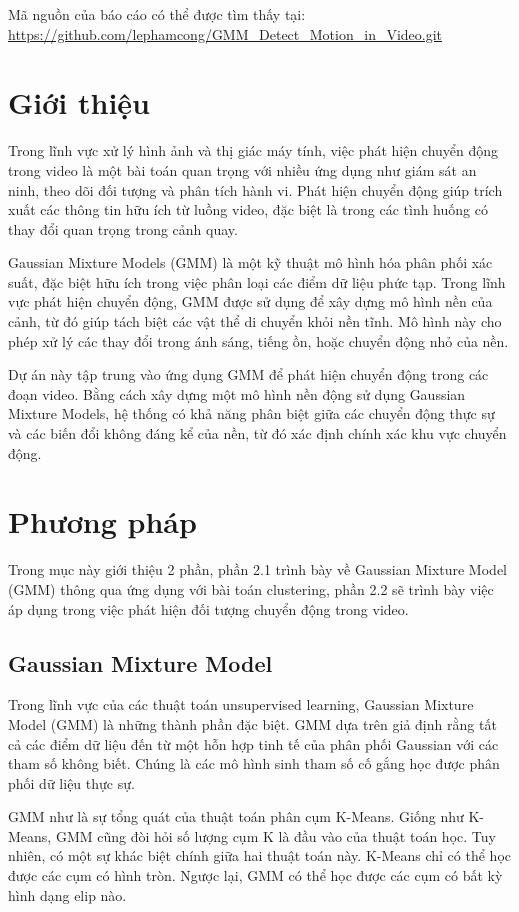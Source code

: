 \documentclass[a4paper]{article}
\begin{document}
Mã nguồn của báo cáo có thể được tìm thấy tại: \url{https://github.com/lephamcong/GMM_Detect_Motion_in_Video.git}

\section{Giới thiệu}
Trong lĩnh vực xử lý hình ảnh và thị giác máy tính, việc phát hiện chuyển động trong video là một bài toán quan trọng với nhiều ứng dụng như giám sát an ninh, theo dõi đối tượng và phân tích hành vi. Phát hiện chuyển động giúp trích xuất các thông tin hữu ích từ luồng video, đặc biệt là trong các tình huống có thay đổi quan trọng trong cảnh quay.

Gaussian Mixture Models (GMM) là một kỹ thuật mô hình hóa phân phối xác suất, đặc biệt hữu ích trong việc phân loại các điểm dữ liệu phức tạp. Trong lĩnh vực phát hiện chuyển động, GMM được sử dụng để xây dựng mô hình nền của cảnh, từ đó giúp tách biệt các vật thể di chuyển khỏi nền tĩnh. Mô hình này cho phép xử lý các thay đổi trong ánh sáng, tiếng ồn, hoặc chuyển động nhỏ của nền.

Dự án này tập trung vào ứng dụng GMM để phát hiện chuyển động trong các đoạn video. Bằng cách xây dựng một mô hình nền động sử dụng Gaussian Mixture Models, hệ thống có khả năng phân biệt giữa các chuyển động thực sự và các biến đổi không đáng kể của nền, từ đó xác định chính xác khu vực chuyển động.

\section{Phương pháp}
Trong mục này giới thiệu 2 phần, phần 2.1 trình bày về Gaussian Mixture Model (GMM) thông qua ứng dụng với bài toán clustering, phần 2.2 sẽ trình bày việc áp dụng trong việc phát hiện đối tượng chuyển động trong video.

\subsection{Gaussian Mixture Model\cite{gaussian_mixture_python}}
Trong lĩnh vực của các thuật toán unsupervised learning, Gaussian Mixture Model  (GMM) là những thành phần đặc biệt. GMM dựa trên giả định rằng tất cả các điểm dữ liệu đến từ một hỗn hợp tinh tế của phân phối Gaussian với các tham số không biết. Chúng là các mô hình sinh tham số cố gắng học được phân phối dữ liệu thực sự. 

GMM như là sự tổng quát của thuật toán phân cụm K-Means. Giống như K-Means, GMM cũng đòi hỏi số lượng cụm K là đầu vào của thuật toán học. Tuy nhiên, có một sự khác biệt chính giữa hai thuật toán này. K-Means chỉ có thể học được các cụm có hình tròn. Ngược lại, GMM có thể học được các cụm có bất kỳ hình dạng elip nào.
\end{document}
